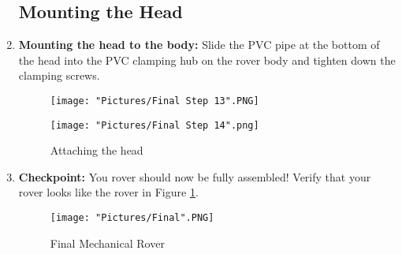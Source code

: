 \documentclass[12pt]{article}
\begin{document}
\begin{enumerate}
\subsection{Mounting the Head}

\item \textbf{Mounting the head to the body:} Slide the PVC pipe at the bottom of the head into the PVC clamping hub on the rover body and tighten down the clamping screws. 

\begin{figure}[H]
  \centering
  \begin{minipage}[b]{0.45\textwidth}
    \texttt{[image: "Pictures/Final Step 13".PNG]}
  \end{minipage}
  \hfill
  \begin{minipage}[b]{0.45\textwidth}
    \texttt{[image: "Pictures/Final Step 14".png]}
  \end{minipage}
  \caption{Attaching the head}
\end{figure}

\item \textbf{Checkpoint:} You rover should now be fully assembled!  Verify that your rover looks like the rover in Figure \ref{final mechanical rover}.
\begin{figure}[H]
  \centering
    \texttt{[image: "Pictures/Final".PNG]}
  \caption{Final Mechanical Rover}
  \label{final mechanical rover}
\end{figure}

\end{enumerate}
\end{document}

